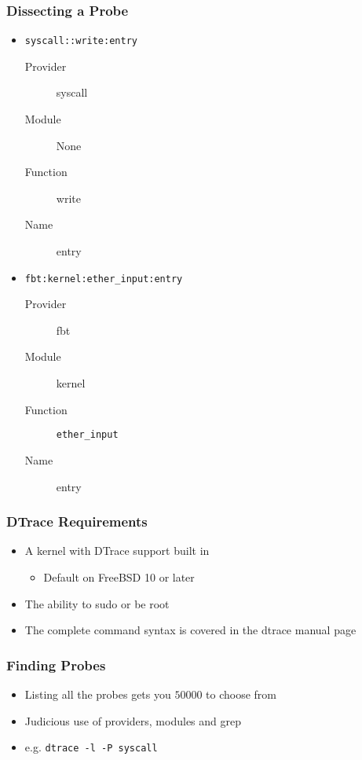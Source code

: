 \documentclass[pdftex]{beamer}
\begin{document}
\begin{frame}[fragile]
  \frametitle{Dissecting a Probe}
  \begin{itemize}
  \item \Verb+syscall::write:entry+
    \begin{description}
    \item[Provider] syscall
    \item[Module] None
    \item[Function] write
    \item[Name] entry
    \end{description}
  \item \Verb+fbt:kernel:ether_input:entry+
    \begin{description}
    \item[Provider] fbt
    \item[Module] kernel
    \item[Function] \Verb+ether_input+
    \item[Name] entry
    \end{description}
  \end{itemize}
\end{frame}

\begin{frame}
  \frametitle{DTrace Requirements}
  \begin{itemize}
  \item A kernel with DTrace support built in
    \begin{itemize}
    \item Default on FreeBSD 10 or later
    \end{itemize}
  \item The ability to sudo or be root
  \item The complete command syntax is covered in the dtrace manual page
  \end{itemize}
\end{frame}

\begin{frame}[fragile]
  \frametitle{Finding Probes}
  \begin{itemize}
  \item Listing all the probes gets you $50000$ to choose from
  \item Judicious use of providers, modules and grep 
  \item e.g. \Verb+dtrace -l -P syscall+
  \end{itemize}
\end{frame}
\end{document}
